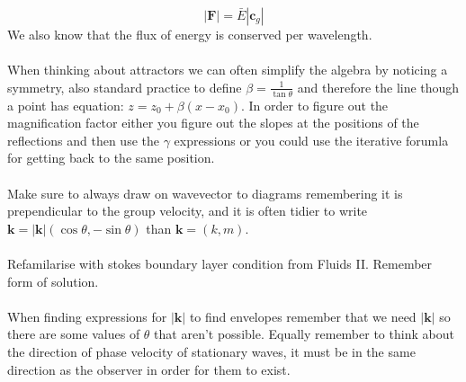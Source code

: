 \documentclass{article}
\begin{document}
           $$
            | \bm F| = \bar E |\bm c_g|
           $$
           We also know that the flux of energy is conserved per wavelength. \\\\
           When thinking about attractors we can often simplify the algebra by noticing a symmetry, also standard practice to define $\beta = \frac{1}{\tan \theta}$ and therefore the line though a point has equation: $z= z_0 + \beta (x- x_0)$. In order to figure out the magnification factor either you figure out the slopes at the positions of the reflections and then use the $\gamma$ expressions or you could use the iterative forumla for getting back to the same position.\\\\
           Make sure to always draw on wavevector to diagrams remembering it is prependicular to the group velocity, and it is often tidier to write $\bm k = |\bm k| (\cos \theta, - \sin \theta)$ than $\bm k = (k,m)$.\\\\
           Refamilarise with stokes boundary layer condition from Fluids II. Remember form of solution.\\\\
           When finding expressions for $|\bm k|$ to find envelopes remember that we need $|\bm k|$ so there are some values of $\theta$ that aren't possible. Equally remember to think about the direction of phase velocity of stationary waves, it must be in the same direction as the observer in order for them to exist.
           
\end{document}

